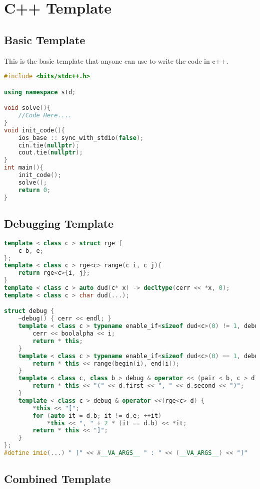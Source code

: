 \chapter{C++ Template}
\label{chap:cpp-template}

\section{Basic Template}

This is the basic template that anyone can use to write the code in c++.

\begin{lstlisting}[language=C++, caption={Main C++ Template}]
#include <bits/stdc++.h>

using namespace std;

void solve(){
    //Code Here....
}
void init_code(){
    ios_base :: sync_with_stdio(false);
    cin.tie(nullptr);
    cout.tie(nullptr);
}
int main(){
    init_code();
    solve();
    return 0;
}

\end{lstlisting}
\newpage
\section{Debugging Template}
\begin{lstlisting}[language=C++, caption={Debugging Template}]
template < class c > struct rge {
    c b, e;
};
template < class c > rge<c> range(c i, c j){
    return rge<c>{i, j};
}
template < class c > auto dud(c* x) -> decltype(cerr << *x, 0);
template < class c > char dud(...);

struct debug {
    ~debug() { cerr << endl; }
    template < class c > typename enable_if<sizeof dud<c>(0) != 1, debug&>::type operator<<(c i) {
        cerr << boolalpha << i;
        return * this;
    }
    template < class c > typename enable_if<sizeof dud<c>(0) == 1, debug&>::type operator<<(c i) {
        return * this << range(begin(i), end(i)); 
    }
    template < class c, class b > debug & operator << (pair < b, c > d) {
        return * this << "(" << d.first << ", " << d.second << ")";
    }
    template < class c > debug & operator <<(rge<c> d) {
        *this << "[";
        for (auto it = d.b; it != d.e; ++it)
            *this << ", " + 2 * (it == d.b) << *it;
        return * this << "]";
    }
};  
#define imie(...) " [" << #__VA_ARGS__ " : " << (__VA_ARGS__) << "]"
\end{lstlisting}
\newpage
\section{Combined Template}

